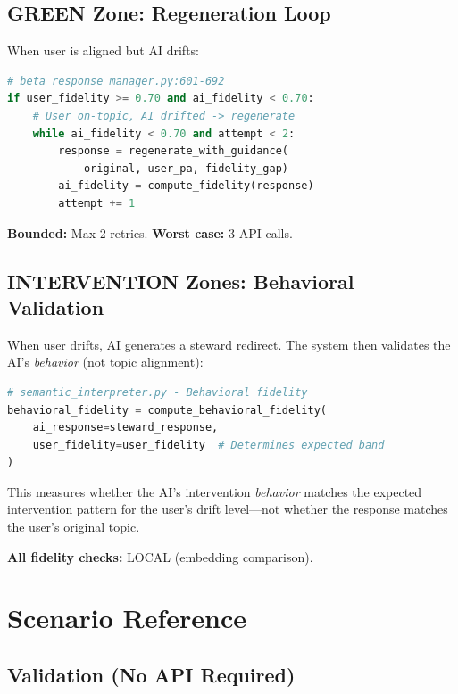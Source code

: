 \documentclass[11pt,twocolumn]{article}
\begin{document}
\subsection{GREEN Zone: Regeneration Loop}

When user is aligned but AI drifts:

\begin{lstlisting}[language=Python]
# beta_response_manager.py:601-692
if user_fidelity >= 0.70 and ai_fidelity < 0.70:
    # User on-topic, AI drifted -> regenerate
    while ai_fidelity < 0.70 and attempt < 2:
        response = regenerate_with_guidance(
            original, user_pa, fidelity_gap)
        ai_fidelity = compute_fidelity(response)
        attempt += 1
\end{lstlisting}

\textbf{Bounded:} Max 2 retries. \textbf{Worst case:} 3 API calls.

\subsection{INTERVENTION Zones: Behavioral Validation}

When user drifts, AI generates a steward redirect. The system then validates the AI's \textit{behavior} (not topic alignment):

\begin{lstlisting}[language=Python]
# semantic_interpreter.py - Behavioral fidelity
behavioral_fidelity = compute_behavioral_fidelity(
    ai_response=steward_response,
    user_fidelity=user_fidelity  # Determines expected band
)
\end{lstlisting}

This measures whether the AI's intervention \textit{behavior} matches the expected intervention pattern for the user's drift level---not whether the response matches the user's original topic.

\textbf{All fidelity checks:} LOCAL (embedding comparison).

\section{Scenario Reference}

\subsection{Validation (No API Required)}
\end{document}

